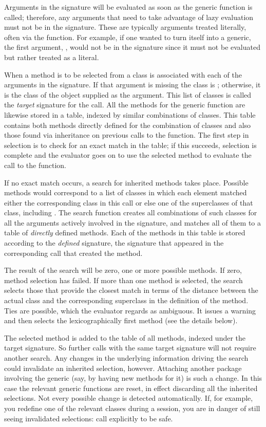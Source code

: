 \documentclass[11pt]{article}
\begin{document}
Arguments in the signature will be evaluated as soon as the generic function is called; therefore, any arguments that need to take advantage of lazy evaluation must not be in the signature.
These are typically arguments treated literally, often via the  function.
For example, if one wanted to turn  itself into a generic, the first argument, , would not be in the signature since it must not be evaluated but rather treated as a literal.

When a method is to be selected from  a class is associated with each of the arguments in the signature.
If that argument is missing the class is ; otherwise, it is the class of the object supplied as the argument.
This list of classes is called the \emph{target} signature for the call.
All the methods for the generic function are likewise stored in a table, indexed by similar combinations of classes.
This table contains both methods directly defined for the combination of classes and also those found via inheritance on previous calls to the function.
The first step in selection is to check for an exact match in the table; if this succeeds, selection is complete and the evaluator goes on to use the selected method to evaluate the call to the function.

If no exact match occurs, a search for inherited methods takes place.
Possible methods would correspond to a list of classes in which each element matched either the corresponding class in this call or else one of the superclasses of that class, including .
The search function creates all combinations of such classes for all the arguments actively involved in the signature, and matches all of them to a table of \emph{directly}  defined methods.
Each of the methods in this table is stored according to the \emph{defined}  signature, the signature that appeared in the corresponding  call that created the method.

The result of the search will be zero, one or more possible methods.
If zero, method selection has failed.
If more than  one method is selected, the search selects those that provide the closest match in terms of the distance between the actual class and the corresponding superclass in the definition of the method.
Ties are possible, which the evaluator regards as ambiguous.
It issues a warning and then selects the lexicographically first method (see the details below).

The selected method is added to the table of all methods, indexed under the target signature.
So further calls with the same target signature will not require another search.
Any changes in the underlying information driving the search could invalidate an inherited selection, however.
Attaching another package involving the generic (say, by having new methods for it) is such a change.
In this case the relevant generic functions are reset, in effect discarding all the inherited selections.
Not every possible change is detected automatically.
If, for example, you redefine one of the relevant classes during a session, you are in danger of still seeing invalidated selections:  call  explicitly to be safe.
\end{document}

